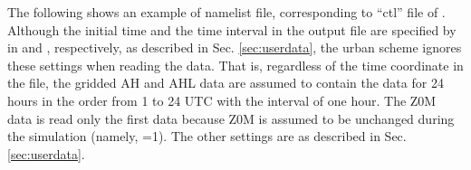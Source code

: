 The following shows an example of namelist file, corresponding to ``ctl'' file of \grads.
%
Although the initial time and the time interval in the output file are specified by  in  and , respectively, as described in Sec. \ref{sec:userdata},
the urban scheme ignores these settings when reading the data.
That is, regardless of the time coordinate in the \scalenetcdf file,
the gridded AH and AHL data are assumed to contain the data for 24 hours in the order from 1 to 24 UTC with the interval of one hour.
The Z0M data is read only the first data because Z0M is assumed to be unchanged during the simulation (namely, =1).
The other settings are as described in Sec. \ref{sec:userdata}.
